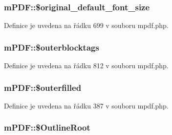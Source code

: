 \hypertarget{classm_p_d_f_a550c518f17e95765778aa90813a38f97}{
\subsubsection[{\$original\-\_\-default\-\_\-font\-\_\-size}]{\setlength{\rightskip}{0pt plus 5cm}m\-P\-D\-F\-::\$original\-\_\-default\-\_\-font\-\_\-size}}\label{classm_p_d_f_a550c518f17e95765778aa90813a38f97}


Definice je uvedena na řádku 699 v souboru mpdf.\-php.

\hypertarget{classm_p_d_f_a41948086171d1cf8bc9a331cc2c86b6e}{
\subsubsection[{\$outerblocktags}]{\setlength{\rightskip}{0pt plus 5cm}m\-P\-D\-F\-::\$outerblocktags}}\label{classm_p_d_f_a41948086171d1cf8bc9a331cc2c86b6e}


Definice je uvedena na řádku 812 v souboru mpdf.\-php.

\hypertarget{classm_p_d_f_ae5552f3985dda72a368bd161a660401f}{
\subsubsection[{\$outerfilled}]{\setlength{\rightskip}{0pt plus 5cm}m\-P\-D\-F\-::\$outerfilled}}\label{classm_p_d_f_ae5552f3985dda72a368bd161a660401f}


Definice je uvedena na řádku 387 v souboru mpdf.\-php.

\hypertarget{classm_p_d_f_a9462c2c4db5a1b4615531225eaffacfa}{
\subsubsection[{\$\-Outline\-Root}]{\setlength{\rightskip}{0pt plus 5cm}m\-P\-D\-F\-::\$\-Outline\-Root}}\label{classm_p_d_f_a9462c2c4db5a1b4615531225eaffacfa}


